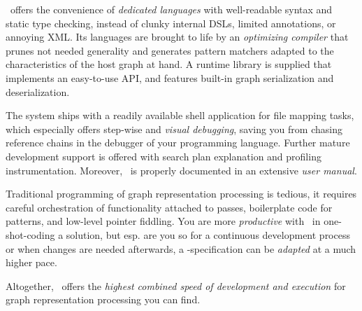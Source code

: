 \GrG\ offers the convenience of \emph{dedicated languages} with well-readable syntax and static type checking, instead of clunky internal DSLs, limited annotations, or annoying XML.
Its languages are brought to life by an \emph{optimizing compiler} that prunes not needed generality and generates pattern matchers adapted to the characteristics of the host graph at hand.
A runtime library is supplied that implements an easy-to-use API, and features built-in graph serialization and deserialization.

The system ships with a readily available shell application for file mapping tasks, which especially offers step-wise and \emph{visual debugging}, saving you from chasing reference chains in the debugger of your programming language.
Further mature development support is offered with search plan explanation and profiling instrumentation. 
Moreover, \GrG\ is properly documented in an extensive \emph{user manual}.

Traditional programming of graph representation processing is tedious, it requires careful orchestration of functionality attached to passes, boilerplate code for patterns, and low-level pointer fiddling.
You are more \emph{productive} with \GrG\ in one-shot-coding a solution, but esp. are you so for a continuous development process or when changes are needed afterwards, a \GrG-specification can be \emph{adapted} at a much higher pace.

Altogether, \GrG\ offers the \emph{highest combined speed of development and execution} for graph representation processing you can find.


